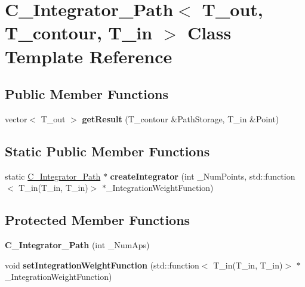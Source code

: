 \hypertarget{class_c___integrator___path}{\section{C\-\_\-\-Integrator\-\_\-\-Path$<$ T\-\_\-out, T\-\_\-contour, T\-\_\-in $>$ Class Template Reference}
\label{class_c___integrator___path}
}
\subsection*{Public Member Functions}
\begin{DoxyCompactItemize}
\item 
\hypertarget{class_c___integrator___path_a95026f1b45d90861f246b828ce9131c0}{vector$<$ T\-\_\-out $>$ {\bfseries get\-Result} (T\-\_\-contour \&Path\-Storage, T\-\_\-in \&Point)}\label{class_c___integrator___path_a95026f1b45d90861f246b828ce9131c0}

\end{DoxyCompactItemize}
\subsection*{Static Public Member Functions}
\begin{DoxyCompactItemize}
\item 
\hypertarget{class_c___integrator___path_ad68512fccb5e8ef0402b214401268a2a}{static \hyperlink{class_c___integrator___path}{C\-\_\-\-Integrator\-\_\-\-Path} $\ast$ {\bfseries create\-Integrator} (int \-\_\-\-Num\-Points, std\-::function$<$ T\-\_\-in(T\-\_\-in, T\-\_\-in)$>$ $\ast$\-\_\-\-Integration\-Weight\-Function)}\label{class_c___integrator___path_ad68512fccb5e8ef0402b214401268a2a}

\end{DoxyCompactItemize}
\subsection*{Protected Member Functions}
\begin{DoxyCompactItemize}
\item 
\hypertarget{class_c___integrator___path_ab4acfaa64baff2436a466a3e2f099827}{{\bfseries C\-\_\-\-Integrator\-\_\-\-Path} (int \-\_\-\-Num\-Aps)}\label{class_c___integrator___path_ab4acfaa64baff2436a466a3e2f099827}

\item 
\hypertarget{class_c___integrator___path_ab02353508a8140cafd2d2cf1ad8368ac}{void {\bfseries set\-Integration\-Weight\-Function} (std\-::function$<$ T\-\_\-in(T\-\_\-in, T\-\_\-in)$>$ $\ast$\-\_\-\-Integration\-Weight\-Function)}\label{class_c___integrator___path_ab02353508a8140cafd2d2cf1ad8368ac}

\end{DoxyCompactItemize}
